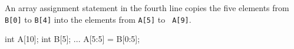 
An array assignment statement in the fourth line copies the five elements
from {\tt B[0]} to {\tt B[4]} into the elements from {\tt A[5]} to {\tt
A[9]}.

\hspace{\hsize}
\begin{XCexample}
int A[10];
int B[5];
    ...
A[5:5] = B[0:5]; 
\end{XCexample}











